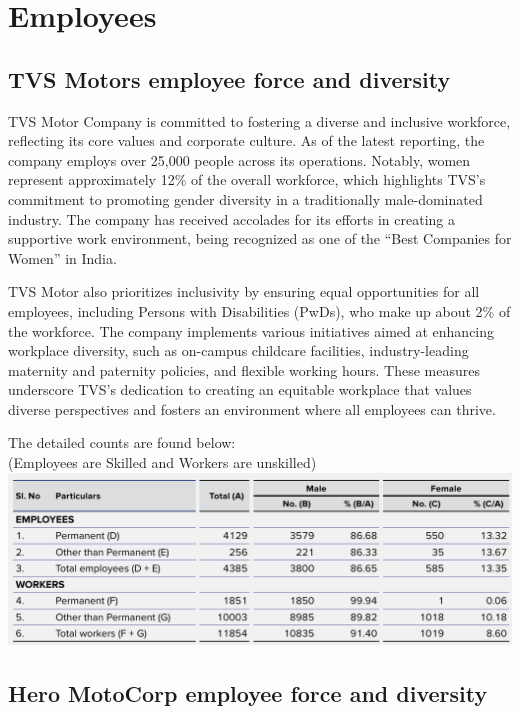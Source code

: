 \section{Employees}

\subsection{TVS Motors employee force and diversity}

TVS Motor Company is committed to fostering a diverse and inclusive workforce, reflecting its core values and corporate culture. As of the latest reporting, the company employs over 25,000 people across its operations. Notably, women represent approximately 12\% \cite{TVS_ANNUAL_REPORT} of the overall workforce, which highlights TVS's commitment to promoting gender diversity in a traditionally male-dominated industry. The company has received accolades for its efforts in creating a supportive work environment, being recognized as one of the “Best Companies for Women” in India.

TVS Motor also prioritizes inclusivity by ensuring equal opportunities for all employees, including Persons with Disabilities (PwDs), who make up about 2\% of the workforce. The company implements various initiatives aimed at enhancing workplace diversity, such as on-campus childcare facilities, industry-leading maternity and paternity policies, and flexible working hours. These measures underscore TVS's dedication to creating an equitable workplace that values diverse perspectives and fosters an environment where all employees can thrive.

The detailed counts are found below:\\
(Employees are Skilled and Workers are unskilled) \\[1cm]
\includegraphics[width=\linewidth]{psycho_images/TVS_employee.png}

\subsection{Hero MotoCorp employee force and diversity}


